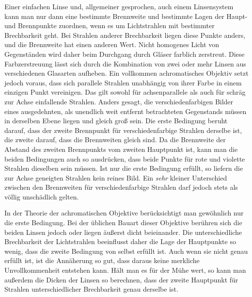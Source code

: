 Einer einfachen Linse und, allgemeiner gesprochen, auch einem Linsensystem kann man nur dann eine bestimmte Brennweite und bestimmte Lagen der Haupt- und Brennpunkte zuordnen, wenn es um Lichtstrahlen mit bestimmter Brechbarkeit geht. Bei Strahlen anderer Brechbarkeit liegen diese Punkte anders, und die Brennweite hat einen anderen Wert. Nicht homogenes Licht von Gegenständen wird daher beim Durchgang durch Gläser farblich zerstreut. Diese Farbzerstreuung lässt sich durch die Kombination von zwei oder
mehr Linsen aus verschiedenen Glasarten aufheben. Ein vollkommen achromatisches Objektiv setzt jedoch voraus, dass sich parallele Strahlen unabhängig von ihrer Farbe in einem einzigen Punkt vereinigen. Das gilt sowohl für achsenparallele als auch für schräg zur Achse einfallende Strahlen. Anders gesagt, die verschiedenfarbigen Bilder eines ausgedehnten, als unendlich weit entfernt betrachteten Gegenstands müssen in derselben Ebene liegen und gleich groß sein. Die erste Bedingung beruht darauf, dass der zweite Brennpunkt für verschiedenfarbige Strahlen derselbe ist, die zweite darauf, dass die Brennweiten gleich sind. Da die Brennweite der Abstand des zweiten Brennpunkts vom zweiten Hauptpunkt ist, kann man die beiden Bedingungen auch so ausdrücken, dass beide Punkte für rote und violette Strahlen dieselben sein müssen. Ist nur die erste Bedingung erfüllt, so liefern die zur Achse geneigten Strahlen kein reines Bild. Ein \textit{sehr} kleiner Unterschied zwischen den Brennweiten für verschiedenfarbige Strahlen darf jedoch stets als völlig unschädlich gelten.

In der Theorie der achromatischen Objektive berücksichtigt man gewöhnlich nur die erste Bedingung. Bei der üblichen Bauart dieser Objektive berühren sich die beiden Linsen jedoch oder liegen äußerst dicht beieinander. Die unterschiedliche Brechbarkeit der Lichtstrahlen beeinflusst daher die Lage der Hauptpunkte so wenig, dass die zweite Bedingung von selbst erfüllt ist. Auch wenn sie nicht genau erfüllt ist, ist die Annäherung so gut, dass daraus keine merkliche Unvollkommenheit entstehen kann. Hält man es für der Mühe wert, so kann man außerdem die Dicken der Linsen so berechnen, dass der zweite Hauptpunkt für Strahlen unterschiedlicher Brechbarkeit genau derselbe ist.

